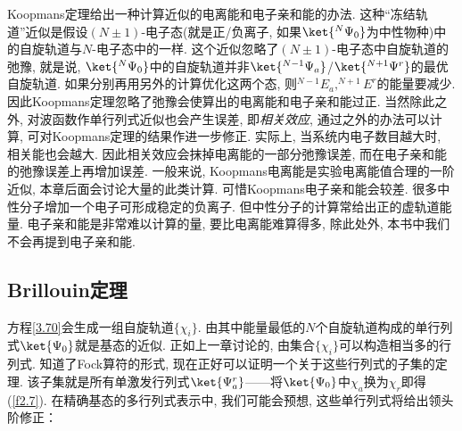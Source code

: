 Koopmans定理给出一种计算近似的电离能和电子亲和能的办法. 这种“冻结轨道”近似是假设$(N\pm1)$-电子态(就是正/负离子, 如果$\ket{^N\Psi_0}$为中性物种)中的自旋轨道与$N$-电子态中的一样. 
这个近似忽略了$(N\pm1)$-电子态中自旋轨道的弛豫, 就是说, $\ket{^N\Psi_0}$中的自旋轨道并非$\ket{^{N-1}\Psi_a}$/$\ket{^{N+1}\Psi^r}$的最优自旋轨道. 
如果分别再用另外的\hft 计算优化这两个态, 则$^{N-1}E_a,^{N+1}E^r$的能量要减少. 因此Koopmans定理忽略了弛豫会使算出的电离能和电子亲和能过正. 
当然除此之外, 对波函数作单行列式近似也会产生误差, 即\emph{相关效应}, 通过\hft 之外的办法可以计算, 可对Koopmans定理的结果作进一步修正. 
实际上, 当系统内电子数目越大时, 相关能也会越大. 
因此相关效应会抹掉电离能的一部分弛豫误差, 而在电子亲和能的弛豫误差上再增加误差. 
一般来说, Koopmans电离能是实验电离能值合理的一阶近似, 本章后面会讨论大量的此类计算. 
可惜Koopmans电子亲和能会较差. 很多中性分子增加一个电子可形成稳定的负离子. 
但中性分子的\hft 计算常给出正的虚轨道能量. 
电子亲和能是非常难以计算的量, 要比电离能难算得多, 除此处外, 本书中我们不会再提到电子亲和能.

\subsection{Brillouin定理}
\label{sec3.3.2}
\hft 方程\autoref{3.70}会生成一组自旋轨道$\{\chi_i\}$. 
由其中能量最低的$N$个自旋轨道构成的单行列式$\ket{\Psi_0}$就是基态的\hft 近似. 
正如上一章讨论的, 由集合$\{\chi_i\}$可以构造相当多的行列式. 
知道了Fock算符的形式, 现在正好可以证明一个关于这些行列式的子集的定理. 
该子集就是所有单激发行列式$\ket{\Psi_a^r}$——将$\ket{\Psi_0}$中$\chi_a$换为$\chi_r$即得(\autoref{f2.7}). 
在精确基态的多行列式表示中, 我们可能会预想, 这些单行列式将给出领头阶修正：

